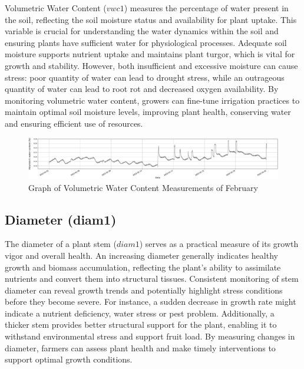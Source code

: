 Volumetric Water Content (\( vwc1 \)) measures the percentage of water present in the soil, reflecting the soil moisture status and availability for plant uptake. This variable is crucial for understanding the water dynamics within the soil and ensuring plants have sufficient water for physiological processes. Adequate soil moisture supports nutrient uptake and maintains plant turgor, which is vital for growth and stability. However, both insufficient and excessive moisture can cause stress: poor quantity of water can lead to drought stress, while an outrageous quantity of water can lead to root rot and decreased oxygen availability. By monitoring volumetric water content, growers can fine-tune irrigation practices to maintain optimal soil moisture levels, improving plant health, conserving water and ensuring efficient use of resources.

\begin{figure}[htbp]
    \centering
    \includegraphics[width=15 cm]{4_ChapterMaterials/figuras/train_data_Volumetric_water_content.pdf}
    \caption{Graph of Volumetric Water Content Measurements of February}
    \end{figure}

\subsection{Diameter (diam1)}

The diameter of a plant stem (\( diam1 \)) serves as a practical measure of its growth vigor and overall health. An increasing diameter generally indicates healthy growth and biomass accumulation, reflecting the plant's ability to assimilate nutrients and convert them into structural tissues. Consistent monitoring of stem diameter can reveal growth trends and potentially highlight stress conditions before they become severe. For instance, a sudden decrease in growth rate might indicate a nutrient deficiency, water stress or pest problem. Additionally, a thicker stem provides better structural support for the plant, enabling it to withstand environmental stress and support fruit load. By measuring changes in diameter, farmers can assess plant health and make timely interventions to support optimal growth conditions.

